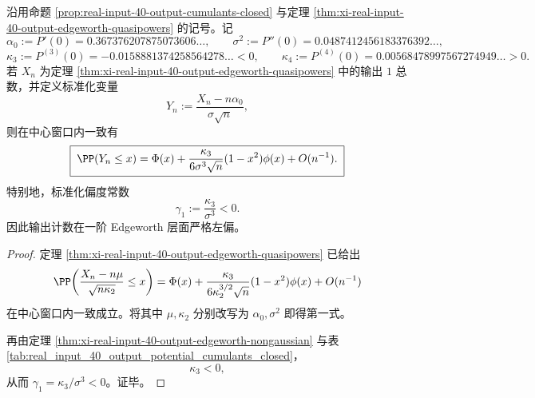 \begin{theorem}\label{thm:xi-time-part65c-output-edgeworth-first-correction}
沿用命题 \ref{prop:real-input-40-output-cumulants-closed} 与定理 \ref{thm:xi-real-input-40-output-edgeworth-quasipowers} 的记号。记
\[
\alpha_0:=P'(0)=0.367376207875073606\ldots,
\qquad
\sigma^2:=P''(0)=0.0487412456183376392\ldots,
\]
\[
\kappa_3:=P^{(3)}(0)=-0.0158881374258564278\ldots<0,
\qquad
\kappa_4:=P^{(4)}(0)=0.00568478997567274949\ldots>0.
\]
若 \(X_n\) 为定理 \ref{thm:xi-real-input-40-output-edgeworth-quasipowers} 中的输出 \(1\) 总数，并定义标准化变量
\[
Y_n:=\frac{X_n-n\alpha_0}{\sigma\sqrt n},
\]
则在中心窗口内一致有
\[
\boxed{\;
\PP(Y_n\le x)
=
\Phi(x)
+\frac{\kappa_3}{6\sigma^3\sqrt n}(1-x^2)\phi(x)
+O(n^{-1}).\;}
\]
特别地，标准化偏度常数
\[
\boxed{\;
\gamma_1:=\frac{\kappa_3}{\sigma^3}<0.\;}
\]
因此输出计数在一阶 Edgeworth 层面严格左偏。
\end{theorem}
\begin{proof}
定理 \ref{thm:xi-real-input-40-output-edgeworth-quasipowers} 已给出
\[
\PP\!\left(
\frac{X_n-n\mu}{\sqrt{n\kappa_2}}
\le x
\right)
=
\Phi(x)
+\frac{\kappa_3}{6\kappa_2^{3/2}\sqrt n}(1-x^2)\phi(x)
+O(n^{-1})
\]
在中心窗口内一致成立。将其中 \(\mu,\kappa_2\) 分别改写为 \(\alpha_0,\sigma^2\) 即得第一式。

再由定理 \ref{thm:xi-real-input-40-output-edgeworth-nongaussian} 与表 \ref{tab:real_input_40_output_potential_cumulants_closed}，
\[
\kappa_3<0,
\]
从而 \(\gamma_1=\kappa_3/\sigma^3<0\)。证毕。
\end{proof}

